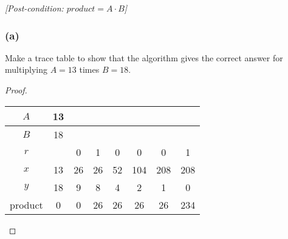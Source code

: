 \documentclass[14pt]{extarticle}
\begin{document}
{\it [Post-condition: $product = A \cdot B$]}

\subsubsection{(a)}
Make a trace table to show that the algorithm gives the correct answer for multiplying $A = 13$ times $B = 18$.

\begin{proof}
    \begin{center}
        \begin{tabular}{|c|c|c|c|c|c|c|c|}
            \hline
            $A$     & 13 &    &    &    &     &     &     \\
            \hline
            $B$     & 18 &    &    &    &     &     &     \\
            \hline
            $r$     &    & 0  & 1  & 0  & 0   & 0   & 1   \\
            \hline
            $x$     & 13 & 26 & 26 & 52 & 104 & 208 & 208 \\
            \hline
            $y$     & 18 & 9  & 8  & 4  & 2   & 1   & 0   \\
            \hline
            product & 0  & 0  & 26 & 26 & 26  & 26  & 234 \\
            \hline
        \end{tabular}
    \end{center}
\end{proof}
\end{document}
